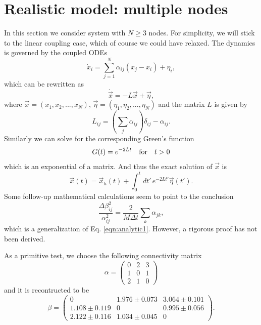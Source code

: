 \documentclass[11pt,a4paper]{article}
\begin{document}
\section{Realistic model: multiple nodes}
In this section we consider system with $N\geq 3$ nodes. For simplicity, we will stick to the linear coupling case, which of course we could have relaxed. The dynamics is governed by the coupled ODEs
\begin{equation}
    \dot{x}_i = \sum_{j=1}^N \alpha_{ij} (x_j-x_i)+\eta_i,
\end{equation}
which can be rewritten as
\begin{equation}
    \dot{\vec{x}} = -L\vec{x} + \vec{\eta},
\end{equation}
where $\vec{x}=(x_1,x_2,...,x_N)$, $\vec{\eta}=(\eta_1,\eta_2,...,\eta_N)$ and the matrix $L$ is given by
\begin{equation}
    L_{ij} = \left(\sum_{j}\alpha_{ij}\right)\delta_{ij} - \alpha_{ij}.
\end{equation}
Similarly we can solve for the corresponding Green's function
\begin{equation}
    G(t) = e^{-2Lt} \qq{for} t>0
\end{equation}
which is an exponential of a matrix. And thus the exact solution of $\vec{x}$ is
\begin{equation}
    \vec{x}(t) = \vec{x}_h(t) + \int_0^t dt'\, e^{-2Lt'}\vec{\eta}(t').
\end{equation}
Some follow-up mathematical calculations seem to point to the conclusion
\begin{equation}
    \frac{\Delta \beta_{ij}^2}{\alpha_{ij}^2} = \frac{2}{M\Delta t} \sum_k \alpha_{jk},
\end{equation}
which is a generalization of Eq. \ref{eqn:analytic1}. However, a rigorous proof has not been derived.

As a primitive test, we choose the following connectivity matrix
\[\alpha = 
\begin{pmatrix}
0 & 2 & 3 \\ 1 & 0 & 1 \\ 2 & 1 & 0
\end{pmatrix}
\]
and it is recontructed to be
\[\beta = 
\begin{pmatrix}
0 & 1.976\pm 0.073 & 3.064\pm 0.101 \\ 1.108\pm 0.119 & 0 & 0.995\pm 0.056 \\ 2.122\pm 0.116 & 1.034 \pm 0.045 & 0
\end{pmatrix}.
\]
\end{document}
